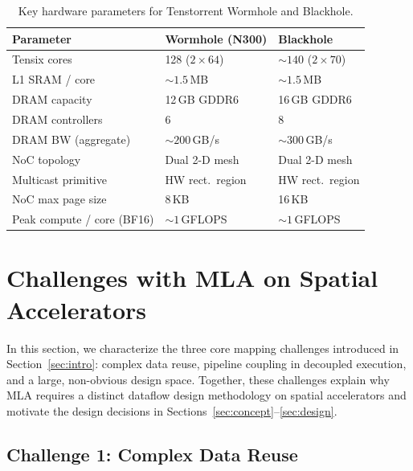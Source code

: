 \documentclass[sigconf, review, anonymous]{acmart}
\begin{document}
\begin{table}[t]
  \caption{Key hardware parameters for Tenstorrent Wormhole and Blackhole.}
  \label{tab:hw-params}
  \centering\small
  \begin{tabular}{lll}
    \toprule
    \textbf{Parameter} & \textbf{Wormhole (N300)} & \textbf{Blackhole} \\
    \midrule
    Tensix cores          & 128 ($2{\times}64$)  & ${\sim}140$ ($2{\times}70$) \\
    L1 SRAM / core        & ${\sim}1.5$\,MB      & ${\sim}1.5$\,MB \\
    DRAM capacity         & 12\,GB GDDR6         & 16\,GB GDDR6 \\
    DRAM controllers      & 6                    & 8 \\
    DRAM BW (aggregate)   & ${\sim}200$\,GB/s    & ${\sim}300$\,GB/s \\
    NoC topology          & Dual 2-D mesh        & Dual 2-D mesh \\
    Multicast primitive   & HW rect.\ region     & HW rect.\ region \\
    NoC max page size     & 8\,KB                & 16\,KB \\
    Peak compute / core (BF16) & ${\sim}1$\,GFLOPS & ${\sim}1$\,GFLOPS \\
    \bottomrule
  \end{tabular}
\end{table}


\section{Challenges with MLA on Spatial Accelerators}\label{sec:challenges}

In this section, we characterize the three core mapping challenges
introduced in Section~\ref{sec:intro}: complex data reuse, pipeline
coupling in decoupled execution, and a large, non-obvious design
space.  Together, these challenges explain why MLA requires a distinct
dataflow design methodology on spatial accelerators and motivate the
design decisions in Sections~\ref{sec:concept}--\ref{sec:design}.



\subsection{Challenge 1: Complex Data Reuse}\label{sec:challenge-reuse}
\end{document}
